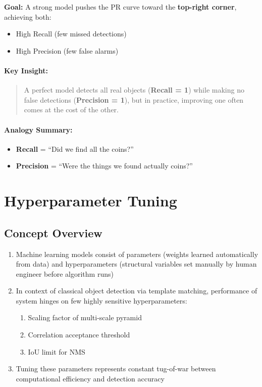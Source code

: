 \documentclass[12pt]{article}
\begin{document}
\textbf{Goal:} A strong model pushes the PR curve toward the \textbf{top-right corner}, achieving both:
\begin{itemize}
    \item High Recall (few missed detections)
    \item High Precision (few false alarms)
\end{itemize}

\paragraph{Key Insight:}

\begin{quote}
    A perfect model detects all real objects (\textbf{Recall = 1}) while making no false detections (\textbf{Precision = 1}), but in practice, improving one often comes at the cost of the other.
\end{quote}

\paragraph{Analogy Summary:}

\begin{itemize}
    \item \textbf{Recall} = ``Did we find all the coins?''
    \item \textbf{Precision} = ``Were the things we found actually coins?''
\end{itemize}


\section{Hyperparameter Tuning}

\subsection{Concept Overview}
\begin{enumerate}
    \item Machine learning models consist of parameters (weights learned automatically from data) and hyperparameters (structural variables set manually by human engineer before algorithm runs)
    \item In context of classical object detection via template matching, performance of system hinges on few highly sensitive hyperparameters:
          \begin{enumerate}
              \item Scaling factor of multi-scale pyramid
              \item Correlation acceptance threshold
              \item IoU limit for NMS
          \end{enumerate}
    \item Tuning these parameters represents constant tug-of-war between computational efficiency and detection accuracy
\end{enumerate}
\end{document}

